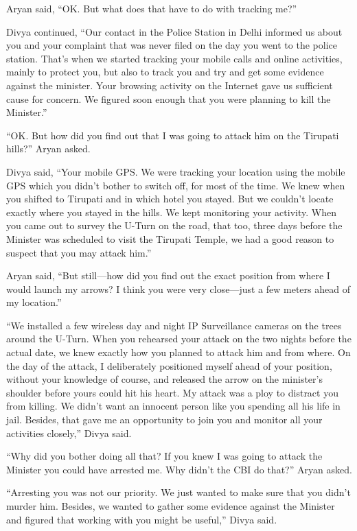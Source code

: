 Aryan said, “OK. But what does that have to do with tracking me?”

Divya continued, “Our contact in the Police Station in Delhi informed us about
you and your complaint that was never filed on the day you went to the police
station. That's when we started tracking your mobile calls and online
activities, mainly to protect you, but also to track you and try and get some
evidence against the minister. Your browsing activity on the Internet gave us
sufficient cause for concern. We figured soon enough that you were planning to
kill the Minister.”

“OK. But how did you find out that I was going to attack him on the Tirupati
hills?” Aryan asked.

Divya said, “Your mobile GPS. We were tracking your location using the mobile
GPS which you didn't bother to switch off, for most of the time. We knew when
you shifted to Tirupati and in which hotel you stayed. But we couldn't locate
exactly where you stayed in the hills. We kept monitoring your activity. When
you came out to survey the U-Turn on the road, that too, three days before the
Minister was scheduled to visit the Tirupati Temple, we had a good reason to
suspect that you may attack him.”

Aryan said, “But still—how did you find out the exact position from where I
would launch my arrows? I think you were very close—just a few meters ahead of
my location.”

“We installed a few wireless day and night IP Surveillance cameras on the trees
around the U-Turn. When you rehearsed your attack on the two nights before the
actual date, we knew exactly how you planned to attack him and from where. On
the day of the attack, I deliberately positioned myself ahead of your position,
without your knowledge of course, and released the arrow on the minister's
shoulder before yours could hit his heart. My attack was a ploy to distract you
from killing. We didn't want an innocent person like you spending all his life
in jail. Besides, that gave me an opportunity to join you and monitor all your
activities closely,” Divya said.

“Why did you bother doing all that? If you knew I was going to attack the
Minister you could have arrested me. Why didn't the CBI do that?” Aryan asked.

“Arresting you was not our priority. We just wanted to make sure that you didn't
murder him. Besides, we wanted to gather some evidence against the Minister and
figured that working with you might be useful,” Divya said.

